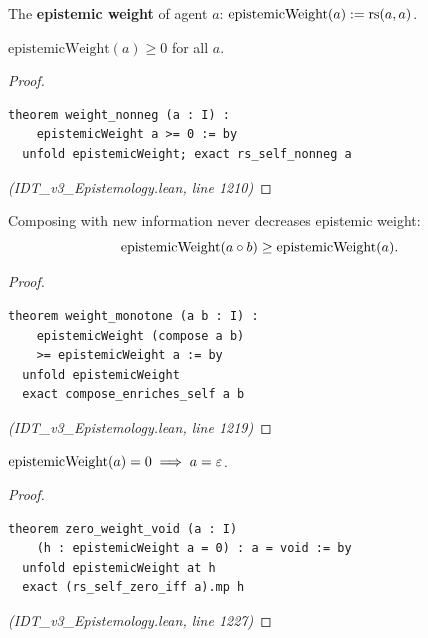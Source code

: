 \begin{definition}
\label{def:epistemic-weight}
The \textbf{epistemic weight} of agent $a$: $\mathrm{epistemicWeight}(a) := \mathrm{rs}(a, a)$.
\end{definition}

\begin{theorem}
\label{thm:weight-nonneg}
$\mathrm{epistemicWeight}(a) \geq 0$ for all $a$.
\end{theorem}

\begin{proof}
\begin{lstlisting}
theorem weight_nonneg (a : I) :
    epistemicWeight a >= 0 := by
  unfold epistemicWeight; exact rs_self_nonneg a
\end{lstlisting}
\textit{(IDT\_v3\_Epistemology.lean, line 1210)}
\end{proof}

\begin{theorem}
\label{thm:weight-monotone}
Composing with new information never decreases epistemic weight:
\[
  \mathrm{epistemicWeight}(a \circ b) \geq \mathrm{epistemicWeight}(a).
\]
\end{theorem}

\begin{proof}
\begin{lstlisting}
theorem weight_monotone (a b : I) :
    epistemicWeight (compose a b)
    >= epistemicWeight a := by
  unfold epistemicWeight
  exact compose_enriches_self a b
\end{lstlisting}
\textit{(IDT\_v3\_Epistemology.lean, line 1219)}
\end{proof}

\begin{theorem}
\label{thm:zero-weight-void}
$\mathrm{epistemicWeight}(a) = 0 \implies a = \varepsilon$.
\end{theorem}

\begin{proof}
\begin{lstlisting}
theorem zero_weight_void (a : I)
    (h : epistemicWeight a = 0) : a = void := by
  unfold epistemicWeight at h
  exact (rs_self_zero_iff a).mp h
\end{lstlisting}
\textit{(IDT\_v3\_Epistemology.lean, line 1227)}
\end{proof}

